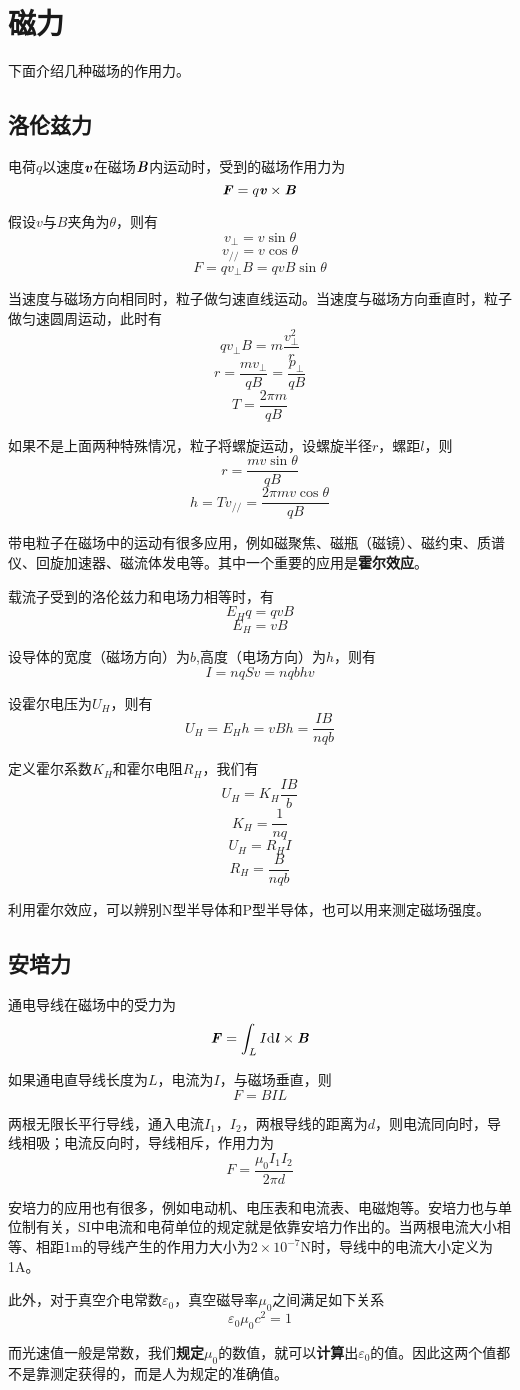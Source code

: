 \documentclass[UTF8,openany]{book}
\begin{document}
	\section{磁力}
	\par 下面介绍几种磁场的作用力。
	\subsection{洛伦兹力}
	电荷$q$以速度$\textbf{\textit{v}}$在磁场$\textbf{\textit{B}}$内运动时，受到的磁场作用力为
	$$\textbf{\textit{F}}=q\textbf{\textit{v}}\times\textbf{\textit{B}}$$
	\par 假设$v$与$B$夹角为$\theta$，则有
	$$v_\perp=v\sin\theta$$
	$$v_{//}=v\cos\theta$$
	$$F=qv_\perp B=qvB\sin\theta$$
	\par 当速度与磁场方向相同时，粒子做匀速直线运动。当速度与磁场方向垂直时，粒子做匀速圆周运动，此时有
	$$qv_{\perp}B=m\frac{v_\perp^2}{r}$$
	$$r=\frac{mv_\perp}{qB}=\frac{p_\perp}{qB}$$
	$$T=\frac{2\pi m}{qB}$$
	\par 如果不是上面两种特殊情况，粒子将螺旋运动，设螺旋半径$r$，螺距$l$，则
	$$r=\frac{mv\sin\theta}{qB}$$
	$$h=Tv_{//}=\frac{2\pi mv\cos\theta}{qB}$$
	\par 带电粒子在磁场中的运动有很多应用，例如磁聚焦、磁瓶（磁镜）、磁约束、质谱仪、回旋加速器、磁流体发电等。其中一个重要的应用是\textbf{霍尔效应}。
	\par 载流子受到的洛伦兹力和电场力相等时，有
	$$E_{H}q=qvB$$
	$$E_{H}=vB$$
	\par 设导体的宽度（磁场方向）为$b$,高度（电场方向）为$h$，则有
	$$I=nqSv=nqbhv$$
	\par 设霍尔电压为$U_H$，则有
	$$U_H=E_Hh=vBh=\frac{IB}{nqb}$$
	\par 定义霍尔系数$K_H$和霍尔电阻$R_H$，我们有
	$$U_H=K_H\frac{IB}{b}$$
	$$K_H=\frac{1}{nq}$$
	$$U_H=R_HI$$
	$$R_H=\frac{B}{nqb}$$
	\par 利用霍尔效应，可以辨别N型半导体和P型半导体，也可以用来测定磁场强度。
	\subsection{安培力}
	\par 通电导线在磁场中的受力为
	$$\textbf{\textit{F}}=\int_{L}I\mathrm{d}\textbf{\textit{l}}\times\textbf{\textit{B}}$$
	\par 如果通电直导线长度为$L$，电流为$I$，与磁场垂直，则
	$$F=BIL$$
	\par 两根无限长平行导线，通入电流$I_1$，$I_2$，两根导线的距离为$d$，则电流同向时，导线相吸；电流反向时，导线相斥，作用力为
	$$F=\frac{\mu_0I_1I_2}{2\pi d}$$
	\par 安培力的应用也有很多，例如电动机、电压表和电流表、电磁炮等。安培力也与单位制有关，SI中电流和电荷单位的规定就是依靠安培力作出的。当两根电流大小相等、相距1m的导线产生的作用力大小为$2\times10^{-7}\mathrm{N}$时，导线中的电流大小定义为1A。
	\par 此外，对于真空介电常数$\varepsilon_0$，真空磁导率$\mu_0$之间满足如下关系
	$$\varepsilon_0\mu_0c^2=1$$
	\par 而光速值一般是常数，我们\textbf{规定}$\mu_0$的数值，就可以\textbf{计算}出$\varepsilon_0$的值。因此这两个值都不是靠测定获得的，而是人为规定的准确值。
	
\end{document}

